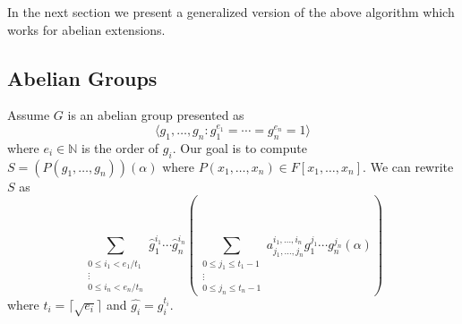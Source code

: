 \documentclass[sigconf]{acmart}
\newcommand{\osumcost}{O(n^{3/4 \omega(4/3)})}
\newcommand{\osumcosttilde}{\tilde{O}(n^{3/4 \omega(4/3)})}
\theoremstyle{acmplain}
\begin{document}

In the next section
we present a generalized version of the above algorithm which works for abelian extensions.

\subsection{Abelian Groups}
Assume $G$ is an abelian group presented as 
$$ \langle g_1, \ldots , g_n: g_{1}^{e_1} = \cdots = g_{n}^{e_n} = 1 \rangle$$
 where $ e_i \in \mathbb{N}$
is the order of $g_i$. Our goal is to compute $S = (P(g_1,  \ldots, g_n))(\alpha)$ where $P(x_1, \ldots,x_n) \in F[x_1, \dots , x_n].$
We can rewrite $S$ as 
$$\sum_{\substack{0 \leq i_1 < e_1/t_1 \\ \vdots \\ 0 \leq i_n < e_n/t_n}} \hat{g}_1^{i_1} \cdots \hat{g}_n^{i_n}(\sum_{\substack{0 \leq j_1 \leq t_1-1\\ \vdots \\ 0 \leq j_n \leq t_n-1}} a^{i_1, \ldots , i_n}_{j_1, \ldots , j_n}g_1^{j_1}\cdots g_n^{j_n}(\alpha))$$
where $t_i = \lceil \sqrt{e_i}\rceil$ and $\hat{g_i} = g_i^{t_i}.$
\end{document}
